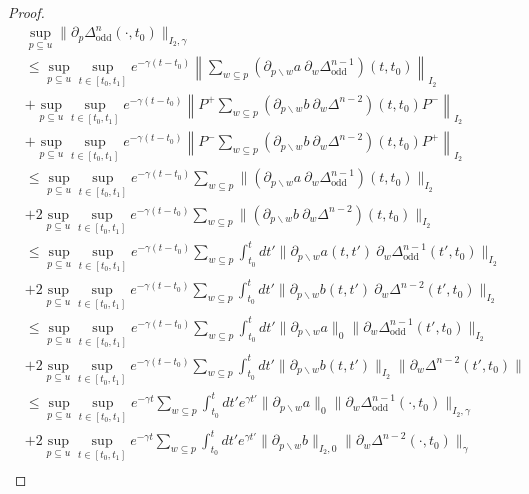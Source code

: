 \documentclass[b5paper,draft,openbib,12pt]{memoir}
\DeclareMathOperator{\odd}{odd}
\begin{document}
\begin{proof}
\begin{align}
&\sup_{p\subseteq u}\|\partial_p \Delta^n_{\odd}(\cdot,t_0) \|_{I_2,\gamma}\\
&\le \sup_{p\subseteq u} \sup_{t\in[t_0,t_1]} e^{-\gamma(t-t_0)}
\left\| \sum_{w\subseteq p} (\partial_{p\backslash w}a ~
\partial_w \Delta^{n-1}_{\odd})(t,t_0)\right\|_{I_2}\\
&+\sup_{p\subseteq u} \sup_{t\in[t_0,t_1]} e^{-\gamma(t-t_0)}
\left\|P^+ \sum_{w\subseteq p} (\partial_{p\backslash w}b ~
\partial_w \Delta^{n-2})(t,t_0) P^-\right\|_{I_2}\\
&+\sup_{p\subseteq u} \sup_{t\in[t_0,t_1]} e^{-\gamma(t-t_0)}
\left\|P^- \sum_{w\subseteq p} (\partial_{p\backslash w}b ~
\partial_w \Delta^{n-2})(t,t_0) P^+\right\|_{I_2}\\
&\le 
\sup_{p\subseteq u} \sup_{t\in[t_0,t_1]} e^{-\gamma(t-t_0)} 
\sum_{w\subseteq p} 
\| (\partial_{p\backslash w}a ~
\partial_w \Delta^{n-1}_{\odd})(t,t_0)\|_{I_2}\\
&+2\sup_{p\subseteq u} \sup_{t\in[t_0,t_1]} 
e^{-\gamma(t-t_0)} \sum_{w\subseteq p} 
\|  (\partial_{p\backslash w}b ~
\partial_w \Delta^{n-2})(t,t_0) \|_{I_2}\\
&\le
\sup_{p\subseteq u}\sup_{t\in[t_0,t_1]} e^{-\gamma(t-t_0)} 
\sum_{w\subseteq p} 
\int_{t_0}^{t}dt' 
\| \partial_{p\backslash w}a(t,t') ~
\partial_w \Delta^{n-1}_{\odd}(t',t_0)\|_{I_2}\\
&+2 \sup_{p\subseteq u}
\sup_{t\in[t_0,t_1]} e^{-\gamma(t-t_0)}\sum_{w\subseteq p} 
\int_{t_0}^{t}dt'  
\|  \partial_{p\backslash w}b(t,t') ~
\partial_w \Delta^{n-2}(t',t_0) \|_{I_2}\\
&\le
\sup_{p\subseteq u}\sup_{t\in[t_0,t_1]} 
e^{-\gamma(t-t_0)} \sum_{w\subseteq p} 
\int_{t_0}^{t}dt' 
\| \partial_{p\backslash w}a\|_{0}
\|\partial_w \Delta^{n-1}_{\odd}(t',t_0)\|_{I_2}\\
&+2 \sup_{p\subseteq u}
\sup_{t\in[t_0,t_1]} e^{-\gamma(t-t_0)}\sum_{w\subseteq p} 
\int_{t_0}^{t}dt'  
\|  \partial_{p\backslash w}b(t,t')\|_{I_2}
\|\partial_w \Delta^{n-2}(t',t_0) \|\\
&\le
\sup_{p\subseteq u}\sup_{t\in[t_0,t_1]} 
e^{-\gamma t} \sum_{w\subseteq p} 
\int_{t_0}^{t}dt' e^{\gamma t'}
\| \partial_{p\backslash w}a\|_{0}
\|\partial_w \Delta^{n-1}_{\odd}(\cdot,t_0)\|_{I_2,\gamma}\\
&+2 \sup_{p\subseteq u}\sup_{t\in[t_0,t_1]} 
e^{-\gamma t}\sum_{w\subseteq p} 
\int_{t_0}^{t}dt'  e^{\gamma t'}
\|  \partial_{p\backslash w}b\|_{I_2,0}
\|\partial_w \Delta^{n-2}(\cdot,t_0) \|_{\gamma}\\

\end{align}
\end{proof}
\end{document}
